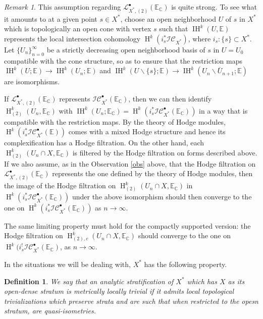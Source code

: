 \documentclass[12pt,letterpaper]{amsart}
\numberwithin{equation}{section}
\def\CC{{\mathbb C}}
\def\EE{{\mathbb E}}
\def\ssm{\smallsetminus}
\def\Iscr{{\mathscr I}}
\def\Lscr{{\mathscr L}}
\def\Cscr{{\mathscr C}}
\def\pt{{\scriptscriptstyle\bullet}}
\newcommand\Hl{\operatorname{H}}
\newcommand\IH{\operatorname{IH}}
\newtheorem{definition}{Definition}\numberwithin{definition}{section}
\theoremstyle{remark}
\newtheorem{remark}[theorem]{Remark}
\begin{document}
\begin{remark}\label{rem:concrete}
This assumption regarding $\Lscr^\pt_{{X^*},(2)}(\EE_\CC)$ is quite strong. To see what it amounts to at a given point  $s\in X^*$, 
choose an open neighborhood $U$ of $s$ in $X^*$  which is  topologically an open cone with vertex $s$ such that $\IH^k(U,\EE)$ represents the 
 local intersection cohomology $\Hl^k(i_s^*\Iscr\Cscr_{X^*})$, where $i_s: \{s\}\subset X^*$. 
 Let  $\{ U_n\}_{n=0}^\infty$ be a strictly decreasing   open neighborhood basis of $s$ in $U=U_0$  
 compatible with the cone structure, so as to 
ensure that  the  restriction maps $\IH^k(U; \EE)\to \IH^k(U_n; \EE)$  and 
$\IH^k(U\ssm \{s\}; \EE)\to \IH^k(U_n\ssm \overline U_{n+1}; \EE)$
are isomorphisms.  

If $\Lscr^\pt_{{X^*},(2)}(\EE_\CC)$ represents $\Iscr\Cscr_{X^*}^\pt(\EE_\CC)$,  then we can then identify   $\Hl^k_{(2)} (U_n, \EE_\CC)$ with 
$\IH^k(U_n; \EE_\CC)=\Hl^k(i_s^*\Iscr\Cscr_{X^*}^\pt(\EE_\CC))$ in a way that is compatible with the restriction maps.  
By the  theory of Hodge modules, $\Hl^k(i_s^*\Iscr\Cscr_{X^*}^\pt(\EE))$ comes with a mixed Hodge structure and hence its 
complexification  has  a Hodge filtration. On the other hand, each $\Hl^k_{(2)} (U_n\cap X, \EE_\CC)$  is filtered by the  Hodge filtration on 
forms described above. If we also assume, as in the Observation \ref{obs} above, that the Hodge filtration on $\Lscr^\pt_{{X^*},(2)}(\EE_\CC)$ 
represents the one defined by the theory of Hodge modules, then the image of the Hodge filtration on  
$\Hl^k_{(2)} (U_n\cap X, \EE_\CC)$ in $ \Hl^k(i_s^*\Iscr\Cscr_{X^*}^\pt(\EE_\CC))$ under  the above isomorphism 
should then converge to the one on $\Hl^k(i_s^*\Iscr\Cscr_{X^*}^\pt(\EE_\CC))$ as $n\to\infty$.  

The same limiting  property must hold for the compactly supported version:  the Hodge  filtration on 
$\Hl^k_{(2),c} (U_n\cap X, \EE_\CC)$ should converge to the one on  $\Hl^k(i_s^!\Iscr\Cscr_{X^*}^\pt(\EE_\CC)$, as $n\to \infty$. 
 \end{remark}

In the situations we will be dealing with, $X^*$ has the following property. 

\begin{definition}\label{def:mettrivial}
We say that an analytic stratification of $X^*$ which has $X$ as its  open-dense stratum is \emph{metrically locally trivial}
if it admits local  topological trivializations  which preserve strata and  are such that when restricted to the opesn stratum,  are quasi-isometries.
\end{definition}
\end{document}
